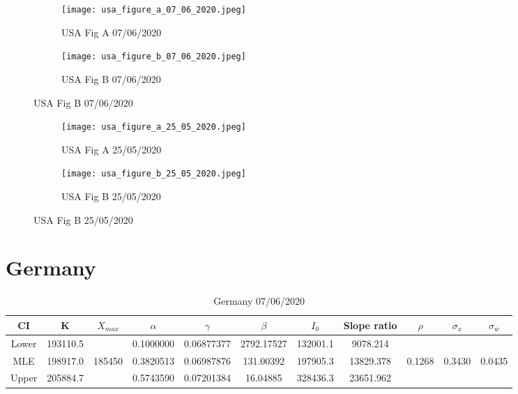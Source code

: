 \documentclass{article}
\begin{document}
\begin{figure}[htb]
\centering
    \begin{subfigure}{0.5\textwidth}
        \texttt{[image: usa\_figure\_a\_07\_06\_2020.jpeg]}
        \caption{USA Fig A 07/06/2020}
        \label{fig:usa_figure_a_07_06_2020}
    \end{subfigure}%
        \begin{subfigure}{0.5\textwidth}                                   \texttt{[image: usa\_figure\_b\_07\_06\_2020.jpeg]}
        \caption{USA Fig B 07/06/2020}
        \label{fig:usa_figure_b_07_06_2020}
    \end{subfigure}
\end{figure}

\begin{figure}[htb]
\centering
    \begin{subfigure}{0.5\textwidth}
        \texttt{[image: usa\_figure\_a\_25\_05\_2020.jpeg]}
        \caption{USA Fig A 25/05/2020}
        \label{fig:usa_figure_a_25_05_2020}
    \end{subfigure}%
        \begin{subfigure}{0.5\textwidth}                                   \texttt{[image: usa\_figure\_b\_25\_05\_2020.jpeg]}
        \caption{USA Fig B 25/05/2020}
        \label{fig:usa_figure_b_25_05_2020}
    \end{subfigure}
\end{figure}

\section{Germany}

\begin{table}[ht]
    \centering
\begin{tabular}{|c|c|c|c|c|c|c|c|c|c|c|}
     \hline
     CI & K & $X_{max}$ & $\alpha$ & $\gamma$ & $\beta$ & $I_0$ & Slope ratio  & $\rho$ & $\sigma_x$ & $\sigma_w$\\
     \hline
     \hline
Lower	&193110.5&	&0.1000000&	0.06877377&	2792.17527	&132001.1	&9078.214   & & & \\
     \hline
MLE	    &198917.0& 185450	&0.3820513&	0.06987876&	131.00392	&197905.3	&13829.378  & 0.1268 & 0.3430 &  0.0435 \\
     \hline
Upper	&205884.7&	&0.5743590&	0.07201384&	16.04885	&328436.3	&23651.962  & & & \\
\hline
\end{tabular}
    \caption{Germany 07/06/2020}
\end{table}
\end{document}
